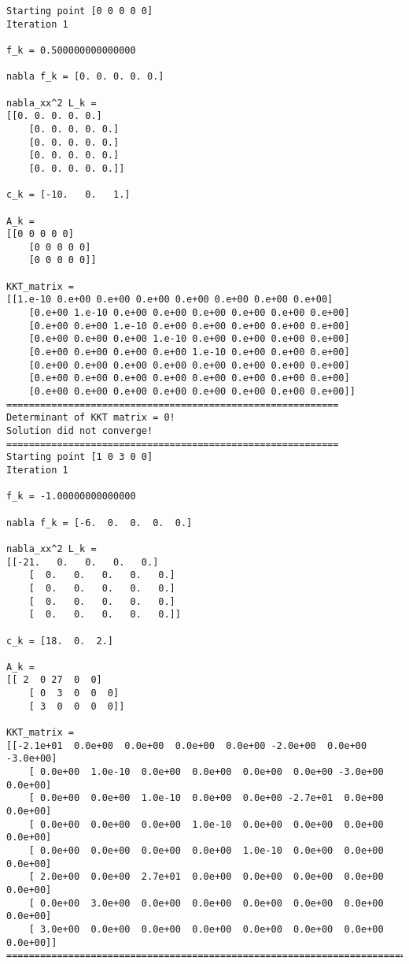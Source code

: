 \documentclass{article}
\begin{document}
\begin{verbatim}
Starting point [0 0 0 0 0]
Iteration 1

f_k = 0.500000000000000

nabla f_k = [0. 0. 0. 0. 0.]

nabla_xx^2 L_k = 
[[0. 0. 0. 0. 0.]
    [0. 0. 0. 0. 0.]
    [0. 0. 0. 0. 0.]
    [0. 0. 0. 0. 0.]
    [0. 0. 0. 0. 0.]]

c_k = [-10.   0.   1.]

A_k = 
[[0 0 0 0 0]
    [0 0 0 0 0]
    [0 0 0 0 0]]

KKT_matrix = 
[[1.e-10 0.e+00 0.e+00 0.e+00 0.e+00 0.e+00 0.e+00 0.e+00]
    [0.e+00 1.e-10 0.e+00 0.e+00 0.e+00 0.e+00 0.e+00 0.e+00]
    [0.e+00 0.e+00 1.e-10 0.e+00 0.e+00 0.e+00 0.e+00 0.e+00]
    [0.e+00 0.e+00 0.e+00 1.e-10 0.e+00 0.e+00 0.e+00 0.e+00]
    [0.e+00 0.e+00 0.e+00 0.e+00 1.e-10 0.e+00 0.e+00 0.e+00]
    [0.e+00 0.e+00 0.e+00 0.e+00 0.e+00 0.e+00 0.e+00 0.e+00]
    [0.e+00 0.e+00 0.e+00 0.e+00 0.e+00 0.e+00 0.e+00 0.e+00]
    [0.e+00 0.e+00 0.e+00 0.e+00 0.e+00 0.e+00 0.e+00 0.e+00]]
===========================================================
Determinant of KKT matrix = 0!
Solution did not converge!
===========================================================
Starting point [1 0 3 0 0]
Iteration 1

f_k = -1.00000000000000

nabla f_k = [-6.  0.  0.  0.  0.]

nabla_xx^2 L_k = 
[[-21.   0.   0.   0.   0.]
    [  0.   0.   0.   0.   0.]
    [  0.   0.   0.   0.   0.]
    [  0.   0.   0.   0.   0.]
    [  0.   0.   0.   0.   0.]]

c_k = [18.  0.  2.]

A_k = 
[[ 2  0 27  0  0]
    [ 0  3  0  0  0]
    [ 3  0  0  0  0]]

KKT_matrix = 
[[-2.1e+01  0.0e+00  0.0e+00  0.0e+00  0.0e+00 -2.0e+00  0.0e+00 -3.0e+00]
    [ 0.0e+00  1.0e-10  0.0e+00  0.0e+00  0.0e+00  0.0e+00 -3.0e+00  0.0e+00]
    [ 0.0e+00  0.0e+00  1.0e-10  0.0e+00  0.0e+00 -2.7e+01  0.0e+00  0.0e+00]
    [ 0.0e+00  0.0e+00  0.0e+00  1.0e-10  0.0e+00  0.0e+00  0.0e+00  0.0e+00]
    [ 0.0e+00  0.0e+00  0.0e+00  0.0e+00  1.0e-10  0.0e+00  0.0e+00  0.0e+00]
    [ 2.0e+00  0.0e+00  2.7e+01  0.0e+00  0.0e+00  0.0e+00  0.0e+00  0.0e+00]
    [ 0.0e+00  3.0e+00  0.0e+00  0.0e+00  0.0e+00  0.0e+00  0.0e+00  0.0e+00]
    [ 3.0e+00  0.0e+00  0.0e+00  0.0e+00  0.0e+00  0.0e+00  0.0e+00  0.0e+00]]
===========================================================================


\end{verbatim}
\end{document}
